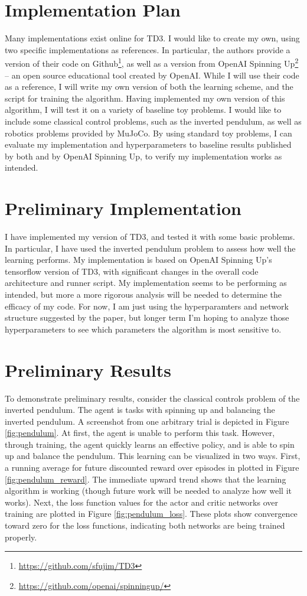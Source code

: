 \documentclass{article}
\begin{document}
\section{Implementation Plan}
Many implementations exist online for TD3. I would like to create my own, using two specific implementations as references. In particular, the authors provide a version of their code on Github\footnote{\url{https://github.com/sfujim/TD3}}, as well as a version from OpenAI Spinning Up\footnote{\url{https://github.com/openai/spinningup/}} -- an open source educational tool created by OpenAI. While I will use their code as a reference, I will write my own version of both the learning scheme, and the script for training the algorithm. Having implemented my own version of this algorithm, I will test it on a variety of baseline toy problems. I would like to include some classical control problems, such as the inverted pendulum, as well as robotics problems provided by MuJoCo. By using standard toy problems, I can evaluate my implementation and hyperparameters to baseline results published by both \citep{Fujimoto:2018_TD3} and by OpenAI Spinning Up, to verify my implementation works as intended.

\section{Preliminary Implementation}
I have implemented my version of TD3, and tested it with some basic problems. In particular, I have used the inverted pendulum problem to assess how well the learning performs. My implementation is based on OpenAI Spinning Up's tensorflow version of TD3, with significant changes in the overall code architecture and runner script. My implementation seems to be performing as intended, but more a more rigorous analysis will be needed to determine the efficacy of my code. For now, I am just using the hyperparamters and network structure suggested by the paper, but longer term I'm hoping to analyze those hyperparameters to see which parameters the algorithm is most sensitive to.

\section{Preliminary Results}
To demonstrate preliminary results, consider the classical controls problem of the inverted pendulum. The agent is tasks with spinning up and balancing the inverted pendulum. A screenshot from one arbitrary trial is depicted in Figure \ref{fig:pendulum}. At first, the agent is unable to perform this task. However, through training, the agent quickly learns an effective policy, and is able to spin up and balance the pendulum. This learning can be visualized in two ways. First, a running average for future discounted reward over episodes in plotted in Figure \ref{fig:pendulum_reward}. The immediate upward trend shows that the learning algorithm is working (though future work will be needed to analyze how well it works). Next, the loss function values for the actor and critic networks over training are plotted in Figure \ref{fig:pendulum_loss}. These plots show convergence toward zero for the loss functions, indicating both networks are being trained properly.



\end{document}
